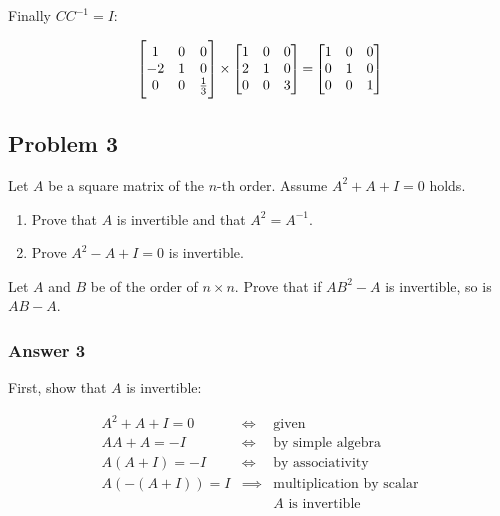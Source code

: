 \documentclass[11pt]{article}
\begin{document}
Finally $CC^{-1}=I$:

\begin{equation*}
  \begin{bmatrix}
    1 & 0 & 0 \\
    -2 & 1 & 0 \\
    0 & 0 & {1\over 3} \\
  \end{bmatrix}
  \begin{aligned} \times \end{aligned}
  \begin{bmatrix}
    1 & 0 & 0 \\
    2 & 1 & 0 \\
    0 & 0 & 3 \\
  \end{bmatrix}
  \begin{aligned} = \end{aligned}
  \begin{bmatrix}
    1 & 0 & 0 \\
    0 & 1 & 0 \\
    0 & 0 & 1 \\
  \end{bmatrix}
\end{equation*}

\subsection{Problem 3}
\label{sec-1-3}

Let $A$ be a square matrix of the $n$-th order.  Assume $A^2+A+I=0$ holds.

\begin{enumerate}
\item Prove that $A$ is invertible and that $A^2=A^{-1}$.
\item Prove $A^2-A+I=0$ is invertible.
\end{enumerate}

Let $A$ and $B$ be of the order of $n \times n$. Prove that if $AB^2-A$ is
invertible, so is $AB-A$.

\subsubsection{Answer 3}
\label{sec-1-3-1}

First, show that $A$ is invertible:

\begin{align*}
  A^2+A+I    =  0  & \iff     & \textrm{given} \\
  AA+A       =  -I & \iff     & \textrm{by simple algebra} \\
  A(A+I)     =  -I & \iff     & \textrm{by associativity} \\
  A(-(A+I))  =  I  & \implies & \textrm{multiplication by scalar} \\
                   &          & \textrm{$A$ is invertible}
\end{align*}
\end{document}
